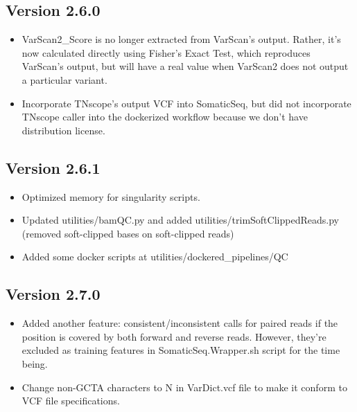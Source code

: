 \documentclass[10pt,letterpaper]{article}
\begin{document}
\begin{sloppypar}
\begin{itemize}
\end{itemize}


\subsection{Version 2.6.0}

\begin{itemize}
  \item
  VarScan2\_Score is no longer extracted from VarScan's output. Rather, it's now calculated directly using Fisher's Exact Test, which reproduces VarScan's output, but will have a real value when VarScan2 does not output a particular variant. 
  
  \item
  Incorporate TNscope's output VCF into SomaticSeq, but did not incorporate TNscope caller into the dockerized workflow because we don't have distribution license. 
  
\end{itemize}



\subsection{Version 2.6.1}

\begin{itemize}
  \item
  Optimized memory for singularity scripts.
  
  \item
  Updated utilities/bamQC.py and added utilities/trimSoftClippedReads.py (removed soft-clipped bases on soft-clipped reads)
  
  \item
  Added some docker scripts at utilities/dockered\_pipelines/QC

\end{itemize}


\subsection{Version 2.7.0}

\begin{itemize}
  \item
  Added another feature: consistent/inconsistent calls for paired reads if the position is covered by both forward and reverse reads. However, they're excluded as training features in SomaticSeq.Wrapper.sh script for the time being. 
  
  \item
  Change non-GCTA characters to N in VarDict.vcf file to make it conform to VCF file specifications. 


\end{itemize}
\end{sloppypar}
\end{document}
